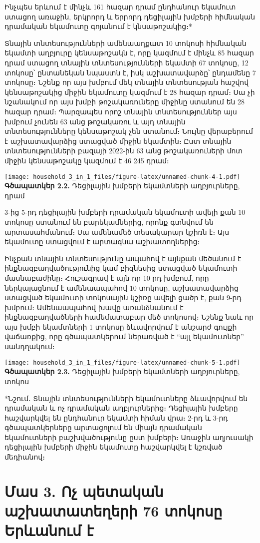 \documentclass[
]{article}
\begin{document}
Ինչպես երևում է մինչև 161 հազար դրամ ընդհանուր եկամուտ ստացող առաջին,
երկրորդ և երրորդ դեցիլային խմբերի հիմնական դրամական եկամուտը գոյանում է
կնսաթոշակից։*

Տնային տնտեսությունների ամենաաղքատ 10 տոկոսի հիմնական եկամտի աղբյուրը
կենսաթոշակն է, որը կազմում է մինչև 85 հազար դրամ ստացող տնային
տնտեսությունների եկամտի 67 տոկոսը, 12 տոկոսը՝ ընտանեկան նպաստն է, իսկ
աշխատավարձը՝ ընդամենը 7 տոկոսը։ Նշենք որ այս խմբում մեկ տնային
տնտեսության հաշվով կենսաթոշակից միջին եկամուտը կազմում է 28 հազար դրամ։
Սա չի նշանակում որ այս խմբի թոշակառուները միջինը ստանում են 28 հազար
դրամ։ Պարզապես որոշ տնային տնտեսություններ այս խմբում չունեն 63 անց
թոշակառու և այդ տնային տնտեսությունները կենսաթոշակ չեն ստանում։ Նույնը
վերաբերում է աշխատավարձից ստացված միջին եկամտին։ Ըստ տնային
տնտեսությունների բազայի 2022-ին 63 անց թոշակառուների մոտ միջին
կենսաթոշակը կազմում է 46 245 դրամ։

\texttt{[image: household\_3\_in\_1\_files/figure-latex/unnamed-chunk-4-1.pdf]}
\textbf{Գծապատկեր 2.2.} Դեցիլային խմբերի եկամտների աղբյուրները, դրամ

3-ից 5-րդ դեցիլային խմբերի դրամական եկամուտի ավելի քան 10 տոկոսը ստանում
են բարեկամներից, որոնք գտնվում են արտասահմանում։ Սա ամենամեծ տեսակարար
կշիռն է։ Այս եկամուտը ստացվում է արտագնա աշխատողներից։

Ինչքան տնային տնտեսությունը ապահով է այնքան մեծանում է
ինքնազբաղվածությունից կամ բիզնեսից ստացված եկամուտի մասնաբաժինը։
Հուշագրավ է այն որ 10-րդ խմբում, որը ներկայացնում է ամենաապահով 10
տոկոսը, աշխատավարձից ստացված եկամուտի տոկոսային կշիռը ավելի ցածր է, քան
9-րդ խմբում։ Ամենաապահով խավը առանձնանում է ինքնազբաղվածների համեմատաբար
մեծ տոկոսով։ Նշենք նաև որ այս խմբի եկամտների 1 տոկոսը ձևավորվում է
անշարժ գույքի վաճառքից, որը գծապատկերում ներառված է ``այլ եկամուտներ''
սանդղակում։

\texttt{[image: household\_3\_in\_1\_files/figure-latex/unnamed-chunk-5-1.pdf]}
\textbf{Գծապատկեր 2.3.} Դեցիլային խմբերի եկամտների աղբյուրները, տոկոս

*Նշում․ Տնային տնտեսությունների եկամուտները ձևավորվում են դրամական և ոչ
դրամական աղբյուրներից։ Դեցիլային խմբերը հաշվարկվել են ընդհանուր եկամտի
հիման վրա։ 2-րդ և 3-րդ գծապատկերները արտացոլում են միայն դրամական
եկամուտների բաշխվածությունը ըստ խմբերի։ Առաջին աղյուսակի դեցիլային
խմբերի միջին եկամուտը հաշվարկվել է կշռված մեդիանով։

\section{Մաս 3. Ոչ պետական աշխատատեղերի 76 տոկոսը Երևանում
է}\label{ux574ux561ux57d-3.-ux578ux579-ux57aux565ux57fux561ux56fux561ux576-ux561ux577ux56dux561ux57fux561ux57fux565ux572ux565ux580ux56b-76-ux57fux578ux56fux578ux57dux568-ux565ux580ux587ux561ux576ux578ux582ux574-ux567}
\end{document}
